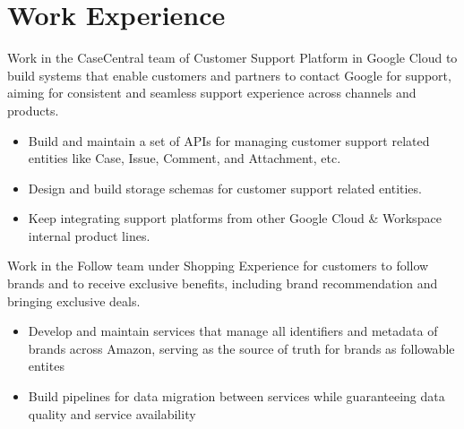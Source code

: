 \documentclass{resume}
\begin{document}
\section{Work Experience}
\begin{flushleft}
Work in the CaseCentral team of Customer Support Platform in Google Cloud to build systems that enable customers and partners to contact Google for support, aiming for consistent and seamless support experience across channels and products.
\begin{itemize}
  \item Build and maintain a set of APIs for managing customer support related entities like Case, Issue, Comment, and Attachment, etc.
  \item Design and build storage schemas for customer support related entities.
  \item Keep integrating support platforms from other Google Cloud \& Workspace internal product lines.
\end{itemize}
\end{flushleft}
\begin{flushleft}
Work in the Follow team under Shopping Experience for customers to follow brands and to receive exclusive benefits, including brand recommendation and bringing exclusive deals.
\begin{itemize}
  \item Develop and maintain services that manage all identifiers and metadata of brands across Amazon, serving as the source of truth for brands as followable entites
  \item Build pipelines for data migration between services while guaranteeing data quality and service availability
\end{itemize}
\end{flushleft}
\end{document}
